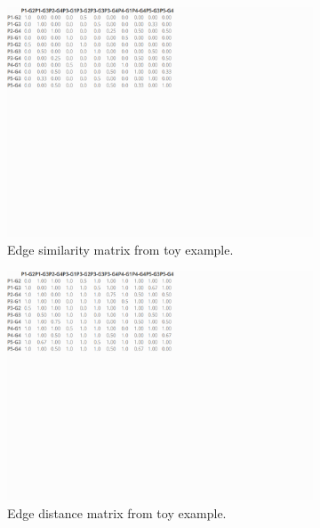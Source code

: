 \documentclass[a4paper,12pt]{extarticle}
\begin{document}
\begin{figure}
    \captionsetup[subfigure]{font=footnotesize,labelfont=footnotesize}
    \centering
     \begin{subfigure}[b]{0.4\textwidth}
        \includegraphics[width=1.0\textwidth]{Toy/toy-sim.png}
        \caption{Edge similarity matrix from toy example.}
        \label{tab:toy-sim}
    \end{subfigure}
     \begin{subfigure}[b]{0.4\textwidth}
        \includegraphics[width=1.0\textwidth]{Toy/toy-dis.png}
        \caption{Edge distance matrix from toy example.}
        \label{tab:toy-dis}
    \end{subfigure}
     \begin{subfigure}[b]{0.6\textwidth}

\end{subfigure}
\end{figure}
\end{document}
